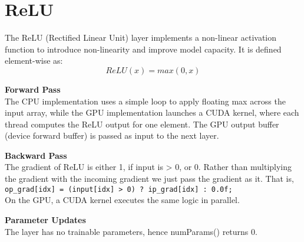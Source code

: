 \section{ReLU}

The ReLU (Rectified Linear Unit) layer implements a non-linear activation function to introduce non-linearity and improve model capacity. It is defined element-wise as:
$$ReLU(x) = max(0,x)$$

\textbf{Forward Pass}\\
The CPU implementation uses a simple loop to apply floating max across the input array, while the GPU implementation launches a CUDA kernel, where each thread computes the ReLU output for one element. The GPU output buffer (device forward buffer) is passed as input to the next layer.

\textbf{Backward Pass}\\
The gradient of ReLU is either 1, if input is > 0, or 0. Rather than multiplying the gradient with the incoming gradient we just pass the gradient as it. That is,\\ \verb|op_grad[idx] = (input[idx] > 0) ? ip_grad[idx] : 0.0f;|\\ On the GPU, a CUDA kernel executes the same logic in parallel.

\textbf{Parameter Updates}\\
The layer has no trainable parameters, hence numParams() returns 0.
